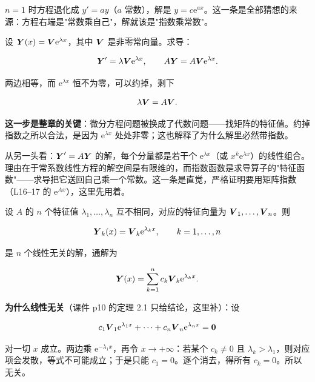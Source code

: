\documentclass[11pt]{ctexart}
\begin{document}


$n=1$ 时方程退化成 $y'=ay$（$a$ 常数），解是 $y=c\mathrm{e}^{ax}$。这一条是全部猜想的来源：方程右端是"常数乘自己"，解就该是"指数乘常数"。


设 $\boldsymbol{Y}(x)=\boldsymbol{V}\mathrm{e}^{\lambda x}$，其中 $\boldsymbol{V}$ 是非零常向量。求导：

\[
\boldsymbol{Y}'=\lambda\boldsymbol{V}\mathrm{e}^{\lambda x},\qquad
A\boldsymbol{Y}=A\boldsymbol{V}\mathrm{e}^{\lambda x}.
\]

两边相等，而 $\mathrm{e}^{\lambda x}$ 恒不为零，可以约掉，剩下

\[
\lambda\boldsymbol{V}=A\boldsymbol{V}.
\]

\textbf{这一步是整章的关键}：微分方程问题被换成了代数问题——找矩阵的特征值。约掉指数之所以合法，是因为 $\mathrm{e}^{\lambda x}$ 处处非零；这也解释了为什么解里必然带指数。


从另一头看：$\boldsymbol{Y}'=A\boldsymbol{Y}$ 的解，每个分量都是若干个 $\mathrm{e}^{\lambda x}$（或 $x^k\mathrm{e}^{\lambda x}$）的线性组合。理由在于常系数线性方程的解空间是有限维的，而指数函数是求导算子的"特征函数"——求导把它送回自己乘一个常数。这一条是直觉，严格证明要用矩阵指数（L16--17 的 $\mathrm{e}^{Ax}$），这里先用着。



设 $A$ 的 $n$ 个特征值 $\lambda_1,\dots,\lambda_n$ 互不相同，对应的特征向量为 $\boldsymbol{V}_1,\dots,\boldsymbol{V}_n$。则

\[
\boldsymbol{Y}_k(x)=\boldsymbol{V}_k\mathrm{e}^{\lambda_k x},\qquad k=1,\dots,n
\]

是 $n$ 个线性无关的解，通解为

\[
\boldsymbol{Y}(x)=\sum_{k=1}^{n}c_k\boldsymbol{V}_k\mathrm{e}^{\lambda_k x}.
\]

\textbf{为什么线性无关}（课件 p10 的定理 2.1 只给结论，这里补）：设

\[
c_1\boldsymbol{V}_1\mathrm{e}^{\lambda_1x}+\cdots+c_n\boldsymbol{V}_n\mathrm{e}^{\lambda_nx}=\boldsymbol{0}
\]

对一切 $x$ 成立。两边乘 $\mathrm{e}^{-\lambda_1x}$，再令 $x\to+\infty$：若某个 $c_k\neq0$ 且 $\lambda_k>\lambda_1$，则对应项会发散，等式不可能成立；于是只能 $c_1=0$。逐个消去，得所有 $c_k=0$。所以无关。
\end{document}
